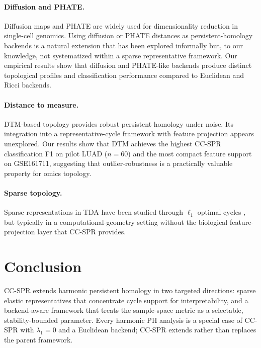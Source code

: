 \documentclass[11pt]{article}
\begin{document}
\paragraph{Diffusion and PHATE.}
Diffusion maps \cite{coifman2006diffusion} and PHATE \cite{moon2019phate} are widely used for dimensionality reduction in single-cell genomics.
Using diffusion or PHATE distances as persistent-homology backends is a natural extension that has been explored informally but, to our knowledge, not systematized within a sparse representative framework.
Our empirical results show that diffusion and PHATE-like backends produce distinct topological profiles and classification performance compared to Euclidean and Ricci backends.

\paragraph{Distance to measure.}
DTM-based topology \cite{chazal2011dtm, chazal2017robust} provides robust persistent homology under noise.
Its integration into a representative-cycle framework with feature projection appears unexplored.
Our results show that DTM achieves the highest CC-SPR classification F1 on pilot LUAD ($n = 60$) and the most compact feature support on GSE161711, suggesting that outlier-robustness is a practically valuable property for omics topology.

\paragraph{Sparse topology.}
Sparse representations in TDA have been studied through $\ell_1$ optimal cycles \cite{chen2011hardness, dey2011optimal}, but typically in a computational-geometry setting without the biological feature-projection layer that CC-SPR provides.

\section{Conclusion}
\label{sec:conclusion}

CC-SPR extends harmonic persistent homology in two targeted directions: sparse elastic representatives that concentrate cycle support for interpretability, and a backend-aware framework that treats the sample-space metric as a selectable, stability-bounded parameter.
Every harmonic PH analysis is a special case of CC-SPR with $\lambda_1 = 0$ and a Euclidean backend; CC-SPR extends rather than replaces the parent framework.
\end{document}
